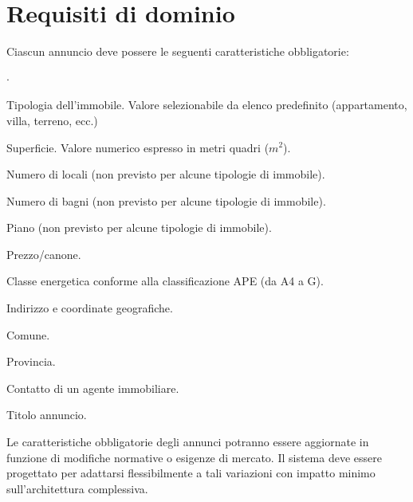 \section{Requisiti di dominio}
Ciascun annuncio deve possere le seguenti caratteristiche obbligatorie:
\begin{list}{$\cdot$}{}
    \item Tipologia dell'immobile. Valore selezionabile da elenco predefinito 
    (appartamento, villa, terreno, ecc.)
    \item Superficie. Valore numerico espresso in metri quadri ($m^2$).
    \item Numero di locali (non previsto per alcune tipologie di immobile).
    \item Numero di bagni (non previsto per alcune tipologie di immobile).
    \item Piano (non previsto per alcune tipologie di immobile).
    \item Prezzo/canone.
    \item Classe energetica conforme alla classificazione APE (da A4 a G).
    \item Indirizzo e coordinate geografiche.
    \item Comune.
    \item Provincia.
    \item Contatto di un agente immobiliare.
    \item Titolo annuncio.
\end{list}

Le caratteristiche obbligatorie degli annunci potranno essere aggiornate in 
funzione di modifiche normative o esigenze di mercato. Il sistema deve essere 
progettato per adattarsi flessibilmente a tali variazioni con impatto minimo 
sull'architettura complessiva.